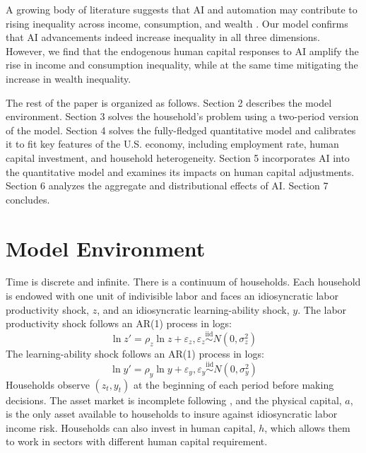 \documentclass[12pt]{article}
\begin{document}
A growing body of literature suggests that AI and automation may contribute to rising inequality across income, consumption, and wealth \citep[e.g.,][]{Sachs2012, berg_should_2018, Prettner2020, hemous_rise_2022}. Our model confirms that AI advancements indeed increase inequality in all three dimensions. However, we find that the endogenous human capital responses to AI amplify the rise in income and consumption inequality, while at the same time mitigating the increase in wealth inequality.


\vspace{1em}
\noindent
The rest of the paper is organized as follows. Section 2 describes the model environment. Section 3 solves the household's problem using a two-period version of the model. Section 4 solves the fully-fledged quantitative model and calibrates it to fit key features of the U.S. economy, including employment rate, human capital investment, and household heterogeneity. Section 5 incorporates AI into the quantitative model and examines its impacts on human capital adjustments. Section 6 analyzes the aggregate and distributional effects of AI. Section 7 concludes.
\section{Model Environment }
\label{sec:model}
Time is discrete and infinite. 
There is a continuum of households. Each household is endowed with one unit of indivisible labor and faces an idiosyncratic labor productivity shock, $z$, and an idiosyncratic learning-ability shock, $y$. The labor productivity shock follows an AR(1) process in logs:
\begin{equation}
    \label{eq:z}
\ln z'=\rho_z\ln z + \varepsilon_z, \varepsilon_z \overset{\mathrm{iid}}{\sim} N(0,\sigma_z^2)
\end{equation}
The learning-ability shock follows an AR(1) process in logs:
\begin{equation}
    \label{eq:y}
\ln y'=\rho_y\ln y + \varepsilon_y, \varepsilon_y \overset{\mathrm{iid}}{\sim} N(0,\sigma_y^2)
\end{equation}
Households observe $(z_t,y_t)$ at the beginning of each period before making decisions.
The asset market is incomplete following \citet{aiyagari_uninsured_1994}, and the physical capital, $a$, is the only asset available to households to insure against idiosyncratic labor income risk. Households can also invest in human capital, $h$, which allows them to work in sectors with different human capital requirement.
\end{document}
